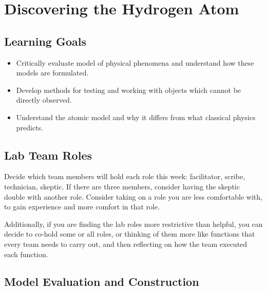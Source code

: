 \chapter{Discovering the Hydrogen Atom}

\section{Learning Goals}

\begin{itemize}
	\item Critically evaluate model of physical phenomena and understand how these models are formulated.
	
	\item Develop methods for testing and working with objects which cannot be directly observed. 
	
	\item Understand the atomic model and why it differs from what classical physics predicts.
\end{itemize}

\section{Lab Team Roles}

Decide which team members will hold each role this week: facilitator, scribe, technician, skeptic. If there are three members, consider having the skeptic double with another role. Consider taking on a role you are less comfortable with, to gain experience and more comfort in that role.

Additionally, if you are finding the lab roles more restrictive than helpful, you can decide to co-hold some or all roles, or thinking of them more like functions that every team needs to carry out, and then reflecting on how the team executed each function.

\section{Model Evaluation and Construction}

